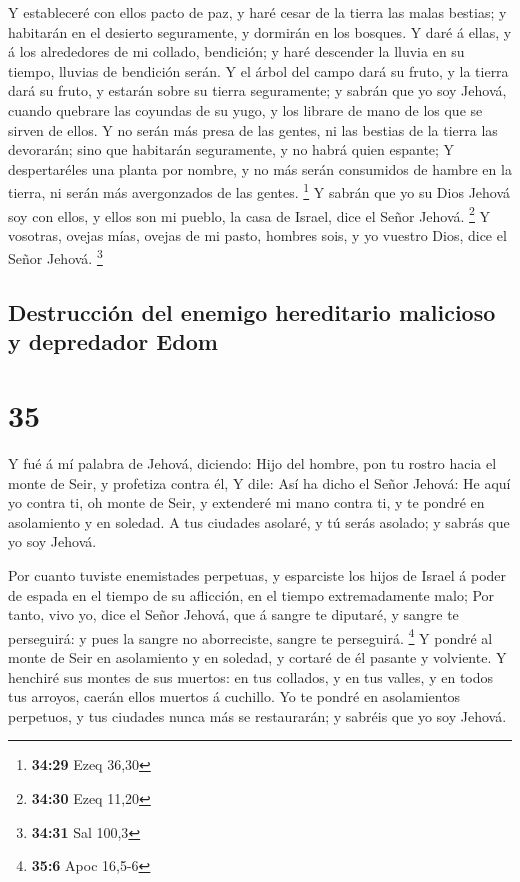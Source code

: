  Y estableceré con ellos pacto de paz, y haré cesar de la
tierra las malas bestias; y habitarán en el desierto seguramente, y
dormirán en los bosques.  Y daré á ellas, y á los
alrededores de mi collado, bendición; y haré descender la lluvia en su
tiempo, lluvias de bendición serán.  Y el árbol del campo
dará su fruto, y la tierra dará su fruto, y estarán sobre su tierra
seguramente; y sabrán que yo soy Jehová, cuando quebrare las coyundas de
su yugo, y los librare de mano de los que se sirven de ellos.
 Y no serán más presa de las gentes, ni las bestias de la
tierra las devorarán; sino que habitarán seguramente, y no habrá quien
espante;  Y despertaréles una planta por nombre, y no más
serán consumidos de hambre en la tierra, ni serán más avergonzados de
las gentes. \footnote{\textbf{34:29} Ezeq 36,30}  Y
sabrán que yo su Dios Jehová soy con ellos, y ellos son mi pueblo, la
casa de Israel, dice el Señor Jehová. \footnote{\textbf{34:30} Ezeq
  11,20}  Y vosotras, ovejas mías, ovejas de mi pasto,
hombres sois, y yo vuestro Dios, dice el Señor Jehová. \footnote{\textbf{34:31}
  Sal 100,3}

\hypertarget{destrucciuxf3n-del-enemigo-hereditario-malicioso-y-depredador-edom}{%
\subsection{Destrucción del enemigo hereditario malicioso y depredador
Edom}\label{destrucciuxf3n-del-enemigo-hereditario-malicioso-y-depredador-edom}}

\hypertarget{section-34}{%
\section{35}\label{section-34}}

 Y fué á mí palabra de Jehová, diciendo: 
Hijo del hombre, pon tu rostro hacia el monte de Seir, y profetiza
contra él,  Y dile: Así ha dicho el Señor Jehová: He aquí
yo contra ti, oh monte de Seir, y extenderé mi mano contra ti, y te
pondré en asolamiento y en soledad.  A tus ciudades
asolaré, y tú serás asolado; y sabrás que yo soy Jehová.

 Por cuanto tuviste enemistades perpetuas, y esparciste
los hijos de Israel á poder de espada en el tiempo de su aflicción, en
el tiempo extremadamente malo;  Por tanto, vivo yo, dice
el Señor Jehová, que á sangre te diputaré, y sangre te perseguirá: y
pues la sangre no aborreciste, sangre te perseguirá. \footnote{\textbf{35:6}
  Apoc 16,5-6}  Y pondré al monte de Seir en asolamiento y
en soledad, y cortaré de él pasante y volviente.  Y
henchiré sus montes de sus muertos: en tus collados, y en tus valles, y
en todos tus arroyos, caerán ellos muertos á cuchillo.  Yo
te pondré en asolamientos perpetuos, y tus ciudades nunca más se
restaurarán; y sabréis que yo soy Jehová.

